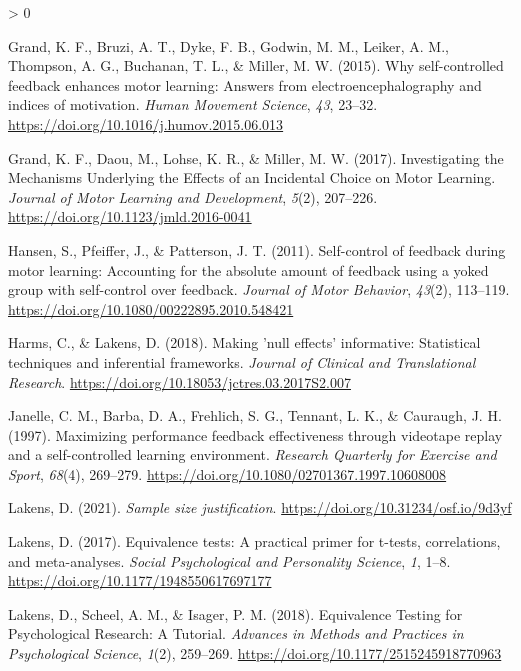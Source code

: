\documentclass[
  english,
  man,floatsintext]{apa7}
\newlength{\cslhangindent}
\newenvironment{CSLReferences}[2] %
 {%
  \setlength{\parindent}{0pt}
  \ifodd #1 \everypar{\setlength{\hangindent}{\cslhangindent}}\ignorespaces\fi
  \ifnum #2 > 0
  \setlength{\parskip}{#2\baselineskip}
  \fi
 }%
 {}
\begin{document}
\begin{CSLReferences}{1}{0}
\leavevmode\hypertarget{ref-grand2015}{}%
Grand, K. F., Bruzi, A. T., Dyke, F. B., Godwin, M. M., Leiker, A. M., Thompson, A. G., Buchanan, T. L., \& Miller, M. W. (2015). Why self-controlled feedback enhances motor learning: Answers from electroencephalography and indices of motivation. \emph{Human Movement Science}, \emph{43}, 23--32. \url{https://doi.org/10.1016/j.humov.2015.06.013}

\leavevmode\hypertarget{ref-grand2017}{}%
Grand, K. F., Daou, M., Lohse, K. R., \& Miller, M. W. (2017). Investigating the Mechanisms Underlying the Effects of an Incidental Choice on Motor Learning. \emph{Journal of Motor Learning and Development}, \emph{5}(2), 207--226. \url{https://doi.org/10.1123/jmld.2016-0041}

\leavevmode\hypertarget{ref-hansen2011}{}%
Hansen, S., Pfeiffer, J., \& Patterson, J. T. (2011). Self-control of feedback during motor learning: Accounting for the absolute amount of feedback using a yoked group with self-control over feedback. \emph{Journal of Motor Behavior}, \emph{43}(2), 113--119. \url{https://doi.org/10.1080/00222895.2010.548421}

\leavevmode\hypertarget{ref-harms2018}{}%
Harms, C., \& Lakens, D. (2018). Making 'null effects' informative: Statistical techniques and inferential frameworks. \emph{Journal of Clinical and Translational Research}. \url{https://doi.org/10.18053/jctres.03.2017S2.007}

\leavevmode\hypertarget{ref-janelle1997}{}%
Janelle, C. M., Barba, D. A., Frehlich, S. G., Tennant, L. K., \& Cauraugh, J. H. (1997). Maximizing performance feedback effectiveness through videotape replay and a self-controlled learning environment. \emph{Research Quarterly for Exercise and Sport}, \emph{68}(4), 269--279. \url{https://doi.org/10.1080/02701367.1997.10608008}

\leavevmode\hypertarget{ref-lakens2021}{}%
Lakens, D. (2021). \emph{Sample size justification}. \url{https://doi.org/10.31234/osf.io/9d3yf}

\leavevmode\hypertarget{ref-R-TOSTER}{}%
Lakens, D. (2017). Equivalence tests: A practical primer for t-tests, correlations, and meta-analyses. \emph{Social Psychological and Personality Science}, \emph{1}, 1--8. \url{https://doi.org/10.1177/1948550617697177}

\leavevmode\hypertarget{ref-lakens2018}{}%
Lakens, D., Scheel, A. M., \& Isager, P. M. (2018). Equivalence Testing for Psychological Research: A Tutorial. \emph{Advances in Methods and Practices in Psychological Science}, \emph{1}(2), 259--269. \url{https://doi.org/10.1177/2515245918770963}


\end{CSLReferences}
\end{document}
